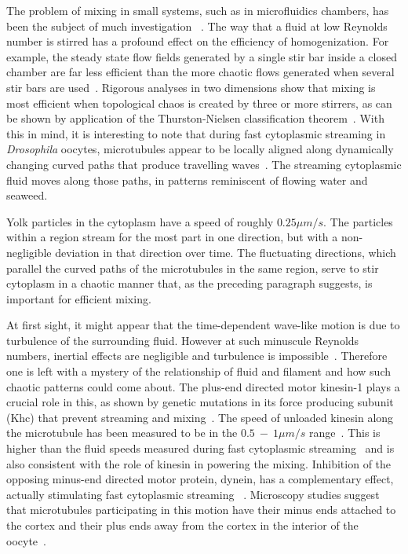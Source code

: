 \documentclass[11pt]{ucthesis}
\begin{document}
The problem of mixing in small systems, such as in microfluidics
chambers, has been the subject of much investigation ~\cite{Squires}. The
way that a fluid at low Reynolds number is stirred has a
profound effect on the efficiency of homogenization. For
example,  the steady state flow fields generated by a single
stir bar inside a closed chamber are far less efficient than
the more chaotic flows generated when  several stir bars are used~\cite{Aref,Aref2000}.
Rigorous analyses in two dimensions show that mixing is
most efficient when topological chaos is created by three or more
stirrers, as can be shown by application of the Thurston-Nielsen
classification theorem~\cite{Thurston,Fathi,Handel}.  With this in mind, it is
interesting to note that during fast cytoplasmic streaming in
{\em Drosophila} oocytes, microtubules appear to be locally aligned
along dynamically changing curved paths that produce travelling
waves~\cite{SerbusSaxton}.  
The streaming cytoplasmic fluid moves along those paths, in patterns reminiscent
of flowing water and seaweed.



Yolk particles in the
cytoplasm have a speed of roughly $0.25 \mu m/s$.  The particles
within a region stream for the most part in one direction,
but with a non-negligible deviation in that direction over
time. The fluctuating directions, which parallel the curved paths of
the microtubules in the same region, serve to stir cytoplasm
in a chaotic manner that, as the preceding paragraph suggests,
is important for efficient mixing.

At first sight, it might appear that the time-dependent wave-like
motion is due to turbulence of the surrounding fluid. However at such minuscule Reynolds
numbers, inertial effects are negligible and turbulence is
impossible~\cite{BergRandomWalksinBiology}. Therefore one is left with a mystery of
the relationship of fluid and filament and
how such chaotic patterns could come about. The plus-end
directed motor kinesin-1 plays a crucial role in this, as
shown by 
genetic mutations in its force producing subunit (Khc)  that prevent streaming and mixing~\cite{SerbusSaxton}.
The speed of unloaded kinesin along the microtubule has been
measured to be in the $0.5 ~-~ 1 \mu m/s$ range~\cite{SvobodaBlock,MeyhoferHoward}.  This is higher
than the fluid speeds measured during fast cytoplasmic streaming~\cite{SerbusSaxton}
and is also consistent with the role of kinesin in powering
the mixing.
Inhibition of the opposing minus-end directed motor protein,
dynein, has a complementary effect,
actually stimulating fast cytoplasmic streaming ~\cite{SerbusSaxton}.  Microscopy studies
suggest that microtubules participating in this motion have their
minus ends attached to the cortex and their plus ends away from
the cortex in the interior of the oocyte~\cite{SerbusSaxton,ChaSerbus}.  
\end{document}
